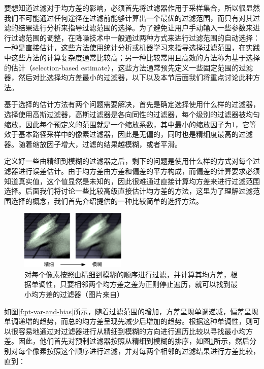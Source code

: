 要想知道过滤对于均方差的影响，必须首先将过滤器作用于采样集合，所以很显然我们不可能通过任何途径在过滤前能够计算出一个最优的过滤范围，而只有对其过滤的结果进行分析来指导过滤范围的选择。为了避免让用户手动输入一些参数来进行过滤范围的调整，在降噪技术中一般通过两种方式来进行过滤范围的自动选择：一种是直接估计，这些方法使用统计分析\cite{a:OnFilteringtheNoisefromtheRandomParametersinMonteCarloRendering}或机器学习\cite{a:AmachinelearningapproachforfilteringMonteCarlonoise}来指导选择过滤范围，在实践中这些方法的计算复杂度通常比较高；另一种比较常用且高效的方法称为基于选择的估计（selection-based estimate），这些方法通常预先定义一些固定范围的过滤器，然后对比选择均方差最小的过滤器，以下以及本节后面我们将重点讨论此种方法。

基于选择的估计方法有两个问题需要解决，首先是确定选择使用什么样的过滤器，\cite{a:AdaptiveSamplingandReconstructionusingGreedyErrorMinimization}选择使用高斯过滤器，高斯过滤器是各向同性的过滤器，每个级别的过滤器被均匀缩放，因此每个预定义的范围就是一个缩放系数，其中最小的缩放因子为1，它等效于基本路径采样中的像素过滤器，因此是无偏的，同时也是精细度最高的过滤器。随着缩放因子增大，过滤的结果越模糊，或者平滑。

定义好一些由精细到模糊的过滤器之后，剩下的问题是使用什么样的方式对每个过滤器进行误差估计。由于均方差由方差和偏差的平方构成，而偏差的计算要求必须知道真实值，这个值显然是未知的，因此很难通过直接计算均方差来进行过滤范围选择。后面我们将讨论一些比较高级直接估计均方差的方法，这里为了理解过滤范围选择的概念，我们首先介绍\cite{a:AdaptiveSamplingandReconstructionusingGreedyErrorMinimization}提供的一种比较简单的选择方法。

\begin{figure}
	\sidecaption
	\includegraphics[width=0.45\textwidth]{figures/pt/fine-to-coarse}
	\caption{对每个像素按照由精细到模糊的顺序进行过滤，并计算其均方差，根据单调性，只要相邻两个均方差之差为正则停止遍历，就可以找到最小均方差的过滤器（图片来自\cite{a:AdaptiveSamplingandReconstructionusingGreedyErrorMinimization}）}
	\label{f:pt-fine-to-coarse}
\end{figure}

如图\ref{f:pt-var-and-bias}所示，随着过滤范围的增加，方差呈现单调递减，偏差呈现单调递增的趋势，而总的均方差呈现先减少后增加的趋势。根据这种单调性，则可以很容易地通过对过滤器进行从精细到模糊的方向进行遍历比较以寻找最小均方差。因此，他们首先对预制过滤器按照从精细到模糊的排序，如图\ref{f:pt-fine-to-coarse}所示，然后分别对每个像素按照这个顺序进行过滤，并对每两个相邻的过滤结果进行方差比较，直到：


